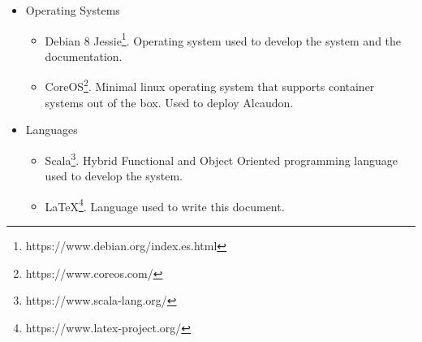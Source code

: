 \begin{itemize}
  \item Operating Systems
    \begin{itemize}
        \item Debian 8 Jessie\footnote{https://www.debian.org/index.es.html}.
          Operating system used to develop the system and the documentation.
        \item CoreOS\footnote{https://www.coreos.com/}. Minimal linux operating
          system that supports container systems out of the box. Used to deploy
          Alcaudon.
    \end{itemize}

  \item Languages
    \begin{itemize}
      \item Scala\footnote{https://www.scala-lang.org/}. Hybrid Functional and
        Object Oriented programming language used to develop the system.
      \item \LaTeX{}\footnote{https://www.latex-project.org/}. Language used to
        write this document.
    \end{itemize}


\end{itemize}
